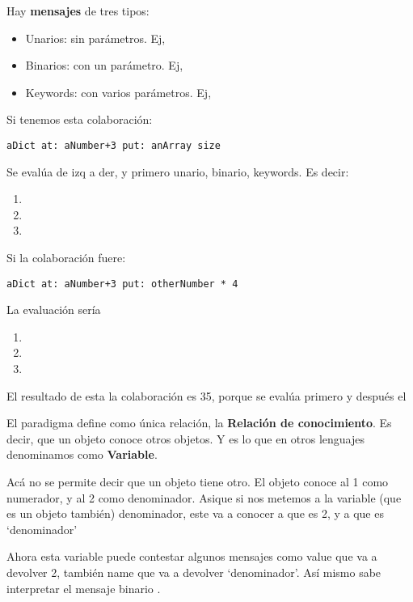Hay \textbf{mensajes} de tres tipos: 
\begin{itemize}\itemsep-0.3em
\item Unarios: sin par\'ametros. Ej, 
\item Binarios: con un par\'ametro. Ej, 
\item Keywords: con varios par\'ametros. Ej, 
\end{itemize}

Si tenemos esta colaboración: 
\begin{verbatim}
aDict at: aNumber+3 put: anArray size
\end{verbatim}

Se evalúa de izq a der, y primero unario, binario, keywords. Es decir:
\begin{enumerate}\itemsep-0.3em
\item {}
\item {}
\item {}
\end{enumerate}

Si la colaboración fuere: 
\begin{verbatim}
aDict at: aNumber+3 put: otherNumber * 4
\end{verbatim}

La evaluación sería
\begin{enumerate}\itemsep-0.3em
 \item {}
 \item {}
 \item {}
\end{enumerate}

El resultado de esta la colaboración  es 35, porque se evalúa primero  y después el 

El paradigma define como única relación, la \textbf{Relación de conocimiento}. Es decir, que un objeto conoce otros objetos. Y es lo que en otros lenguajes denominamos como \textbf{Variable}. 

Acá no se permite decir que un objeto tiene otro. El objeto  conoce al 1 como numerador, y al 2 como denominador. 
Asique si nos metemos a la variable (que es un objeto también) denominador, este va a conocer a  que es 2, y a  que es ‘denominador’

Ahora esta variable puede contestar algunos mensajes como value que va a devolver 2, también name que va a devolver ‘denominador’. Así mismo sabe interpretar el mensaje binario . 

